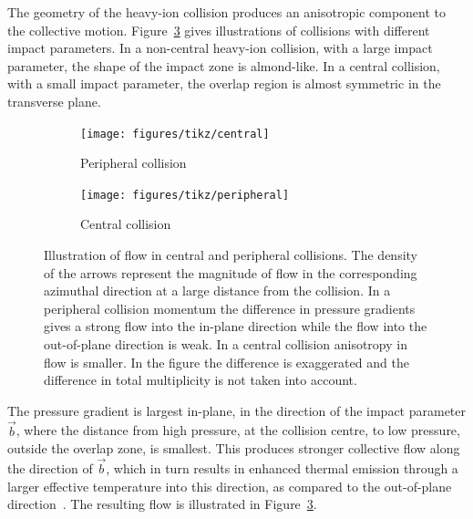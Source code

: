 The geometry of the heavy-ion collision produces an anisotropic component to the collective motion. Figure~\ref{fig:flow} gives illustrations of collisions with different impact parameters. In a non-central heavy-ion collision, with a large impact parameter, the shape of the impact zone is almond-like. In a central collision, with a small impact parameter, the overlap region is almost symmetric in the transverse plane.
\begin{figure}[b!]
\centering
        \begin{subfigure}[b]{0.52\textwidth}
                \centering
	         \texttt{[image: figures/tikz/central]}

                \caption{Peripheral collision}
                \label{fig:InteractionB}
        \end{subfigure}
        \begin{subfigure}[b]{0.45\textwidth}
                \centering
                \texttt{[image: figures/tikz/peripheral]}

                \caption{Central collision}
                \label{fig:InteractionA}
        \end{subfigure}
	\caption[Illustration of flow in momentum space in central and peripheral collisions.]{Illustration of flow in central and peripheral collisions. The density of the arrows represent the magnitude of flow in the corresponding azimuthal direction at a large distance from the collision. In a peripheral collision momentum the difference in pressure gradients gives a strong flow into the in-plane direction while the flow into the out-of-plane direction is weak. In a central collision anisotropy in flow is smaller. In the figure the difference is exaggerated and the difference in total multiplicity is not taken into account.}
	\label{fig:flow}
\end{figure}

The pressure gradient is largest in-plane, in the direction of the impact parameter $\vec b$, where the distance from high pressure, at the collision centre, to low pressure, outside the overlap zone, is smallest. This produces stronger collective flow along the direction of $\vec b$, which in turn results in enhanced thermal emission through a larger effective temperature into this direction, as compared to the out-of-plane direction~\cite{Ollitrault:1992,Ollitrault:1993, Heinz:2002}. The resulting flow is illustrated in Figure~\ref{fig:flow}. %

